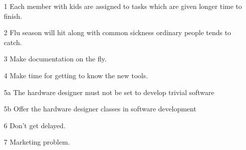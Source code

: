 \documentclass[Main]{subfiles}
\begin{document}

\begin{itemize}
	\item[1] Each member with kids are assigned to tasks which are given longer time to finish.
	\item[2] Flu season will hit along with common sickness ordinary people tends to catch.
	\item[3] Make documentation on the fly.
	\item[4] Make time for getting to know the new tools.
	\item[5a] The hardware designer must not be set to develop trivial software
	\item[5b] Offer the hardware designer classes in software development
	\item[6] Don't get delayed.
	\item[7] Marketing problem.
\end{itemize}
\end{document}
